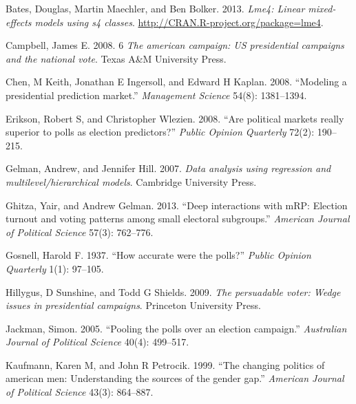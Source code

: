 Bates, Douglas, Martin Maechler, and Ben Bolker. 2013. \emph{Lme4:
Linear mixed-effects models using s4 classes}.
\url{http://CRAN.R-project.org/package=lme4}.

Campbell, James E. 2008. 6 \emph{The american campaign: US presidential
campaigns and the national vote}. Texas A\&M University Press.

Chen, M Keith, Jonathan E Ingersoll, and Edward H Kaplan. 2008.
``Modeling a presidential prediction market.'' \emph{Management Science}
54(8): 1381--1394.

Erikson, Robert S, and Christopher Wlezien. 2008. ``Are political
markets really superior to polls as election predictors?'' \emph{Public
Opinion Quarterly} 72(2): 190--215.

Gelman, Andrew, and Jennifer Hill. 2007. \emph{Data analysis using
regression and multilevel/hierarchical models}. Cambridge University
Press.

Ghitza, Yair, and Andrew Gelman. 2013. ``Deep interactions with mRP:
Election turnout and voting patterns among small electoral subgroups.''
\emph{American Journal of Political Science} 57(3): 762--776.

Gosnell, Harold F. 1937. ``How accurate were the polls?'' \emph{Public
Opinion Quarterly} 1(1): 97--105.

Hillygus, D Sunshine, and Todd G Shields. 2009. \emph{The persuadable
voter: Wedge issues in presidential campaigns}. Princeton University
Press.

Jackman, Simon. 2005. ``Pooling the polls over an election campaign.''
\emph{Australian Journal of Political Science} 40(4): 499--517.

Kaufmann, Karen M, and John R Petrocik. 1999. ``The changing politics of
american men: Understanding the sources of the gender gap.''
\emph{American Journal of Political Science} 43(3): 864--887.

